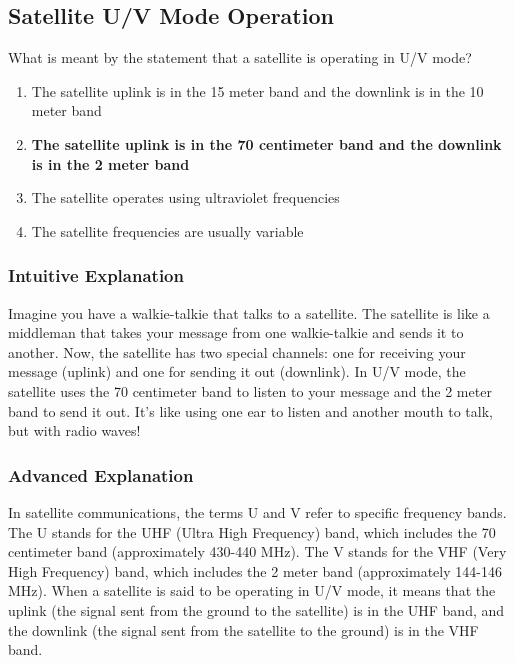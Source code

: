 \subsection{Satellite U/V Mode Operation}
\label{T8B08}

\begin{tcolorbox}[colback=gray!10!white,colframe=black!75!black,title=T8B08]
What is meant by the statement that a satellite is operating in U/V mode?
\begin{enumerate}[label=\Alph*]
    \item The satellite uplink is in the 15 meter band and the downlink is in the 10 meter band
    \item \textbf{The satellite uplink is in the 70 centimeter band and the downlink is in the 2 meter band}
    \item The satellite operates using ultraviolet frequencies
    \item The satellite frequencies are usually variable
\end{enumerate}
\end{tcolorbox}

\subsubsection{Intuitive Explanation}
Imagine you have a walkie-talkie that talks to a satellite. The satellite is like a middleman that takes your message from one walkie-talkie and sends it to another. Now, the satellite has two special channels: one for receiving your message (uplink) and one for sending it out (downlink). In U/V mode, the satellite uses the 70 centimeter band to listen to your message and the 2 meter band to send it out. It's like using one ear to listen and another mouth to talk, but with radio waves!

\subsubsection{Advanced Explanation}
In satellite communications, the terms U and V refer to specific frequency bands. The U stands for the UHF (Ultra High Frequency) band, which includes the 70 centimeter band (approximately 430-440 MHz). The V stands for the VHF (Very High Frequency) band, which includes the 2 meter band (approximately 144-146 MHz). When a satellite is said to be operating in U/V mode, it means that the uplink (the signal sent from the ground to the satellite) is in the UHF band, and the downlink (the signal sent from the satellite to the ground) is in the VHF band.

